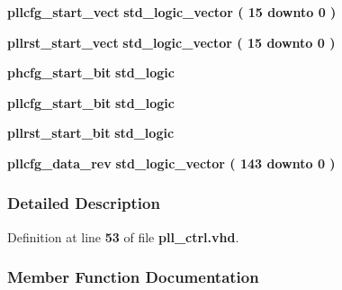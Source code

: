 \begin{DoxyCompactItemize}
\item 
{\bf pllcfg\+\_\+start\+\_\+vect} {\bfseries \textcolor{comment}{std\+\_\+logic\+\_\+vector}\textcolor{vhdlchar}{ }\textcolor{vhdlchar}{(}\textcolor{vhdlchar}{ }\textcolor{vhdlchar}{ } \textcolor{vhdldigit}{15} \textcolor{vhdlchar}{ }\textcolor{keywordflow}{downto}\textcolor{vhdlchar}{ }\textcolor{vhdlchar}{ } \textcolor{vhdldigit}{0} \textcolor{vhdlchar}{ }\textcolor{vhdlchar}{)}\textcolor{vhdlchar}{ }} 
\item 
{\bf pllrst\+\_\+start\+\_\+vect} {\bfseries \textcolor{comment}{std\+\_\+logic\+\_\+vector}\textcolor{vhdlchar}{ }\textcolor{vhdlchar}{(}\textcolor{vhdlchar}{ }\textcolor{vhdlchar}{ } \textcolor{vhdldigit}{15} \textcolor{vhdlchar}{ }\textcolor{keywordflow}{downto}\textcolor{vhdlchar}{ }\textcolor{vhdlchar}{ } \textcolor{vhdldigit}{0} \textcolor{vhdlchar}{ }\textcolor{vhdlchar}{)}\textcolor{vhdlchar}{ }} 
\item 
{\bf phcfg\+\_\+start\+\_\+bit} {\bfseries \textcolor{comment}{std\+\_\+logic}\textcolor{vhdlchar}{ }} 
\item 
{\bf pllcfg\+\_\+start\+\_\+bit} {\bfseries \textcolor{comment}{std\+\_\+logic}\textcolor{vhdlchar}{ }} 
\item 
{\bf pllrst\+\_\+start\+\_\+bit} {\bfseries \textcolor{comment}{std\+\_\+logic}\textcolor{vhdlchar}{ }} 
\item 
{\bf pllcfg\+\_\+data\+\_\+rev} {\bfseries \textcolor{comment}{std\+\_\+logic\+\_\+vector}\textcolor{vhdlchar}{ }\textcolor{vhdlchar}{(}\textcolor{vhdlchar}{ }\textcolor{vhdlchar}{ } \textcolor{vhdldigit}{143} \textcolor{vhdlchar}{ }\textcolor{keywordflow}{downto}\textcolor{vhdlchar}{ }\textcolor{vhdlchar}{ } \textcolor{vhdldigit}{0} \textcolor{vhdlchar}{ }\textcolor{vhdlchar}{)}\textcolor{vhdlchar}{ }} 
\end{DoxyCompactItemize}


\subsubsection{Detailed Description}


Definition at line {\bf 53} of file {\bf pll\+\_\+ctrl.\+vhd}.



\subsubsection{Member Function Documentation}
